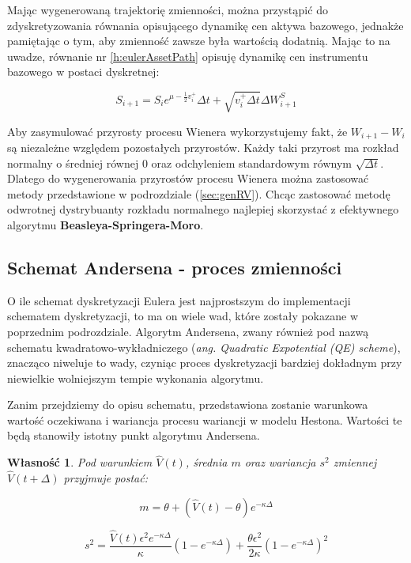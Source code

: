\documentclass{pracamgr}
\newtheorem{prop}{Własność}
\begin{document}
Mając wygenerowaną trajektorię zmienności, można przystąpić do zdyskretyzowania równania opisującego 
dynamikę cen aktywa bazowego, jednakże pamiętając o tym, aby zmienność zawsze była wartością dodatnią. 
Mając to na uwadze, równanie nr \ref{h:eulerAssetPath} opisuję dynamikę cen instrumentu bazowego w postaci dyskretnej:

\begin{equation}\label{h:eulerAssetPath}
S_{i+1} = S_i e^{\mu - \frac{1}{2} v_i^+} \Delta t + \sqrt{v_i^+ \Delta t}  \Delta W_{i+1}^S
\end{equation}
  
Aby zasymulować przyrosty procesu Wienera wykorzystujemy fakt, że $W_{i+1}  - W_{i}$ są niezależne względem pozostałych przyrostów. 
Każdy taki przyrost ma rozkład normalny o średniej równej $0$  oraz odchyleniem standardowym równym $\sqrt{\Delta t}$. 
Dlatego do wygenerowania przyrostów procesu Wienera można zastosować metody przedstawione w podrozdziale (\ref{sec:genRV}). Chcąc zastosować metodę odwrotnej dystrybuanty rozkładu normalnego najlepiej skorzystać z efektywnego algorytmu \textbf{Beasleya-Springera-Moro}.


\subsection{Schemat Andersena - proces zmienności}
\label{sec:algorytm_andersena}
O ile schemat dyskretyzacji Eulera jest najprostszym do implementacji schematem dyskretyzacji, to ma on wiele wad, które zostały pokazane w poprzednim podrozdziale.
Algorytm Andersena, zwany również pod nazwą schematu kwadratowo-wykładniczego (\textit{ang. Quadratic Expotential (QE) scheme}),
znacząco niweluje to wady, czyniąc proces dyskretyzacji bardziej dokładnym przy niewielkie wolniejszym tempie wykonania algorytmu. 

Zanim przejdziemy do opisu schematu, przedstawiona zostanie warunkowa wartość oczekiwana i wariancja procesu wariancji w modelu Hestona. Wartości te będą stanowiły istotny punkt algorytmu Andersena.
\begin{prop}
Pod warunkiem $\hat{V}(t)$, średnia $m$ oraz wariancja $s^2$ zmiennej $\hat{V}(t + \Delta)$ przyjmuje postać:

\begin{equation}
  \label{eq:m}
  m= \theta + (\hat{V}(t) - \theta) e^{-\kappa \Delta}
\end{equation}

\begin{equation}
  \label{eq:s2}
  s^2 = \frac{\hat{V}(t)\epsilon^2 e^{-\kappa \Delta}}{\kappa} (1 - e^{-\kappa \Delta}) + \frac{\theta \epsilon^2}{2 \kappa}(1 - e^{-\kappa \Delta})^2
\end{equation}
\end{prop}
 
\end{document}
